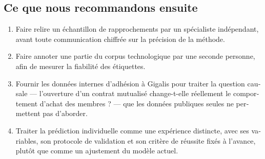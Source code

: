 \begin{otherlanguage}{french}
\subsection*{Ce que nous recommandons ensuite}

\begin{enumerate}
\def\labelenumi{\arabic{enumi}.}
\tightlist
\item
  Faire relire un échantillon de rapprochements par un spécialiste indépendant, avant toute communication chiffrée sur la précision de la méthode.
\item
  Faire annoter une partie du corpus technologique par une seconde personne, afin de mesurer la fiabilité des étiquettes.
\item
  Fournir les données internes d'adhésion à Gigalis pour traiter la question causale --- l'ouverture d'un contrat mutualisé change-t-elle réellement le comportement d'achat des membres ? --- que les données publiques seules ne permettent pas d'aborder.
\item
  Traiter la prédiction individuelle comme une expérience distincte, avec ses variables, son protocole de validation et son critère de réussite fixés à l'avance, plutôt que comme un ajustement du modèle actuel.
\end{enumerate}

\end{otherlanguage}

